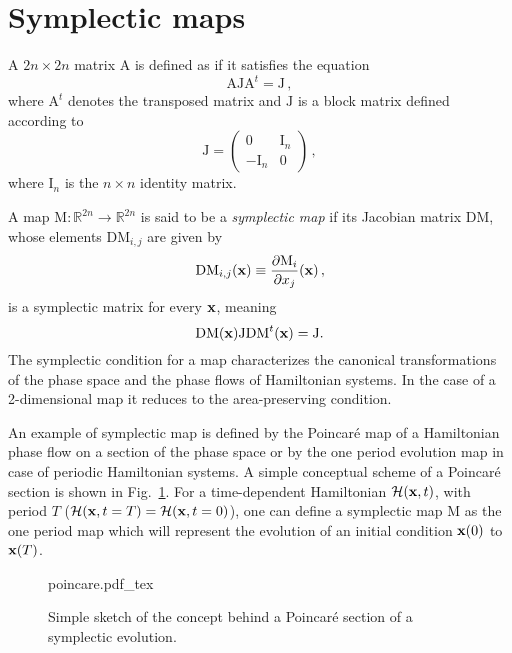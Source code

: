 \section{Symplectic maps}

A $2n \times 2n$ matrix $\mathrm{A}$ is defined as  if it satisfies the equation
\begin{equation}
    \mathrm{A} \mathrm{J} \mathrm{A}^t=\mathrm{J} \,,
\end{equation}
where $\mathrm{A}^t$ denotes the transposed matrix and $\mathrm{J}$ is a block matrix defined according to
\begin{equation}
    \mathrm{J}=\left(\begin{array}{cc}
        0 & \mathrm{I}_n \\
        -\mathrm{I}_n & 0 
    \end{array}\right) \,,
\end{equation}
where $\mathrm{I}_n$ is the $n\times n$ identity matrix.

A map $\mathrm{M}: \mathbb{R}^{2n} \rightarrow \mathbb{R}^{2n}$ is said to be a \textit{symplectic map} if its Jacobian matrix $\mathrm{DM}$, whose elements $\mathrm{DM}_{i, j}$ are given by
\begin{equation}
    \mathrm{DM}_{i, j}(\vb{x}) \equiv \frac{\partial \mathrm{M}_i}{\partial x_j}(\vb{x}) \,,
\end{equation}
is a symplectic matrix for every $\vb{x}$, meaning
\begin{equation}
    \mathrm{DM}(\vb{x}) \mathrm{J} \mathrm{DM}^t(\vb{x})=\mathrm{J} .
\end{equation}
The symplectic condition for a map characterizes the canonical transformations of the phase space and the phase flows of Hamiltonian systems. In the case of a 2-dimensional map it reduces to the area-preserving condition.

An example of symplectic map is defined by the Poincaré map of a Hamiltonian phase flow on a section of the phase space or by the one period evolution map in case of periodic Hamiltonian systems.  A simple conceptual scheme of a Poincaré section is shown in Fig.~\ref{fig:poincare}. For a time-dependent Hamiltonian $\mathcal{H}(\vb{x}, t)$, with period $T$ ($\mathcal{H}(\vb{x}, t=T) = \mathcal{H}(\vb{x}, t=0)$), one can define a symplectic map $\mathrm{M}$ as the one period map which will represent the evolution of an initial condition $\vb{x}(0)$ to $\vb{x}(T)$. 

\begin{figure}
	\centering
	\def\svgwidth{0.5\columnwidth}
    {poincare.pdf_tex}
    \caption{Simple sketch of the concept behind a Poincaré section of a symplectic evolution.}
    \label{fig:poincare}
\end{figure}

